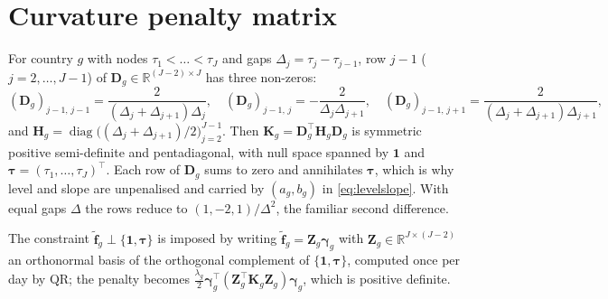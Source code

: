 \documentclass[11pt,a4paper]{article}
\theoremstyle{definition}
\theoremstyle{remark}
\newcommand{\R}{\mathbb{R}}
\newcommand{\T}{^{\top}}
\newcommand{\bff}{\bm{f}}
\begin{document}
\section{Curvature penalty matrix}\label{app:curve}
For country $g$ with nodes $\tau_1<\dots<\tau_J$ and gaps $\Delta_j=\tau_j-\tau_{j-1}$, row $j-1$ ($j=2,\dots,J-1$) of $\bm D_g\in\R^{(J-2)\times J}$ has three non-zeros:
\[
(\bm D_g)_{j-1,\,j-1}=\frac{2}{(\Delta_j+\Delta_{j+1})\Delta_j},\quad
(\bm D_g)_{j-1,\,j}=-\frac{2}{\Delta_j\Delta_{j+1}},\quad
(\bm D_g)_{j-1,\,j+1}=\frac{2}{(\Delta_j+\Delta_{j+1})\Delta_{j+1}},
\]
and $\bm H_g=\operatorname{diag}\bigl((\Delta_j+\Delta_{j+1})/2\bigr)_{j=2}^{J-1}$. Then $\bm K_g=\bm D_g\T\bm H_g\bm D_g$ is symmetric positive semi-definite and pentadiagonal, with null space spanned by $\bm1$ and $\bm\tau=(\tau_1,\dots,\tau_J)\T$. Each row of $\bm D_g$ sums to zero and annihilates $\bm\tau$, which is why level and slope are unpenalised and carried by $(a_g,b_g)$ in \eqref{eq:levelslope}. With equal gaps $\Delta$ the rows reduce to $(1,-2,1)/\Delta^2$, the familiar second difference.

The constraint $\tilde{\bff}_g\perp\{\bm1,\bm\tau\}$ is imposed by writing $\tilde{\bff}_g=\bm Z_g\bm\gamma_g$ with $\bm Z_g\in\R^{J\times(J-2)}$ an orthonormal basis of the orthogonal complement of $\{\bm1,\bm\tau\}$, computed once per day by QR; the penalty becomes $\tfrac{\lambda_g}{2}\bm\gamma_g\T(\bm Z_g\T\bm K_g\bm Z_g)\bm\gamma_g$, which is positive definite.
\end{document}
